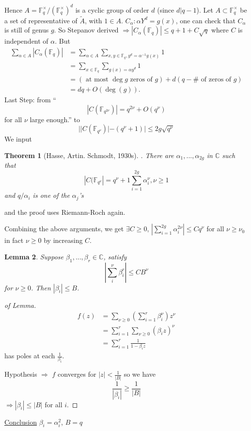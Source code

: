 \documentclass[11pt]{article}
\newtheorem{thm}{Theorem}[section]
\newtheorem{lemma}[thm]{Lemma}
\newcommand{\cplx}{\mathbb C}
\newcommand{\bbf}{\mathbb F}
\newcommand{\Lrta}{\Longrightarrow}
\begin{document}
Hence $A=\bbf^\times_q/(\bbf^\times_q)^d$ is a cyclic group of order $d$ (since $d|q-1$). Let $A\subset \bbf^\times_q$ be a set of  representative of $\tilde{A}$, with $1\in A$.
$C_\alpha:\alpha Y^d=g(x)$, one can check that $C_\alpha$ is still of genus $g$. So Stepanov derived 
$\Lrta |C_\alpha(\bbf_q)|\leq q+1+C\sqrt{q}$ where $C$ is independent of $\alpha$.  But
 $$
 \begin{aligned}
 \sum_{\alpha\in A}|C_\alpha(\bbf_q)|&=\sum_{\alpha\in A}\sum_{x,y\in \bbf_q, y^d=\alpha^{-1}g(x)}1\\
 &=\sum_{x\in \bbf_q}\sum_{g(x)=\alpha y^d}1\\
 &=(\text{ at most $\deg g$ zeros of $g$})+ d(q-\# \text{ of zeros of $g$} )\\
 &= dq +O(\deg (g)).
 \end{aligned}
 $$
 Last Step: from ``
  $$
  |C(\bbf_{q^{2\nu}})|=q^{2\nu}+O(q^\nu)
  $$
  for all $\nu$ large enough.''
  to
  $$
||C(\bbf_{q^\nu})|-(q^\nu+1)|\leq 2g \sqrt{q^\nu}
  $$
We input 
\begin{thm}
[Hasse, Artin. Schmodt, 1930s]. There are $\alpha_1,...,\alpha_{2g}$ in $\cplx$ such that
 $$|C(\bbf_{q^\nu}|=q^\nu+1\sum^{2g}_{i=1}\alpha_i^\nu, \nu \geq 1$$ 
 and $q/\alpha_i$ is one of the $\alpha_j$'s
\end{thm}
and the proof uses Riemann-Roch again.

Combining the above arguments, we get
$\exists C\geq 0$, $|\sum_{i=1}^{2g}\alpha_i^{2\nu}|\leq C q^\nu$ for all $\nu \geq \nu_0$ in fact $\nu \geq 0$ by increasing $C$. 
\begin{lemma}
Suppose $\beta_1,...,\beta_r\in \cplx$, satisfy 
$$
|\sum_i^\nu \beta_i^r|\leq C B^\nu
$$
for $\nu \geq 0$. Then $|\beta_i|\leq B$. 
\end{lemma}
\begin{proof}[of Lemma]
$$
\begin{aligned}
f(z)&=\sum_{\nu \geq 0}\left(\sum_{i=1}^r\beta_i^\nu\right)z^\nu\\
&=\sum_{i=1}^r\sum_{\nu\geq 0}(\beta_i z)^\nu\\
&=\sum^r_{i=1}\frac{1}{1-\beta_i z}
\end{aligned}
$$
has poles at each $\frac{1}{\beta_i}$.

Hypothesis $\Lrta$ $f$ converges for $|z|<\frac{1}{|B|}$ so we have
$$
\frac{1}{|\beta_i|}\geq \frac{1}{|B|}
$$
$\Lrta |\beta_i|\leq |B|$ for all $i$.
\end{proof}

\underline{Conclusion}
$\beta_i=\alpha_i^2$, $B=q$
\end{document}
